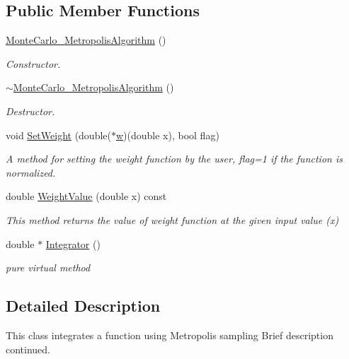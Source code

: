 \subsection*{Public Member Functions}
\begin{DoxyCompactItemize}
\item 
\hyperlink{class_monte_carlo___metropolis_algorithm_a80995ad029b056ca675c751c247426a5}{Monte\+Carlo\+\_\+\+Metropolis\+Algorithm} ()
\begin{DoxyCompactList}\small\item\em Constructor. \end{DoxyCompactList}\item 
\hyperlink{class_monte_carlo___metropolis_algorithm_aecedd40f8c0098bc66d455ef06814981}{$\sim$\+Monte\+Carlo\+\_\+\+Metropolis\+Algorithm} ()
\begin{DoxyCompactList}\small\item\em Destructor. \end{DoxyCompactList}\item 
void \hyperlink{class_monte_carlo___metropolis_algorithm_ac19d55a838561eaecea3ea519de7e091}{Set\+Weight} (double($\ast$\hyperlink{main_8cpp_a6f95c347c46d0a26fc68408b470a98df}{w})(double x), bool flag)
\begin{DoxyCompactList}\small\item\em A method for setting the weight function by the user, flag=1 if the function is normalized. \end{DoxyCompactList}\item 
double \hyperlink{class_monte_carlo___metropolis_algorithm_a5295f6e5691292d833da48105b13ece4}{Weight\+Value} (double x) const
\begin{DoxyCompactList}\small\item\em This method returns the value of weight function at the given input value (x) \end{DoxyCompactList}\item 
double $\ast$ \hyperlink{class_monte_carlo___metropolis_algorithm_a93fba72a50330bf184156e23158992b2}{Integrator} ()
\begin{DoxyCompactList}\small\item\em pure virtual method \end{DoxyCompactList}\end{DoxyCompactItemize}


\subsection{Detailed Description}
This class integrates a function using Metropolis sampling Brief description continued. 


